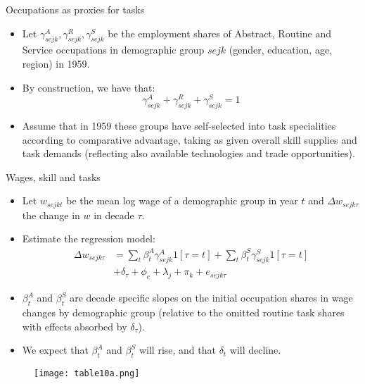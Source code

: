 \documentclass[notes=show]{beamer}
\begin{document}
\begin{frame}{Occupations as proxies for tasks}
\begin{itemize}
\item Let $ \gamma_{sejk}^{A}, \gamma_{sejk}^{R}, \gamma_{sejk}^{S}$ be the employment shares of Abstract, Routine and Service occupations in  demographic group $sejk$ (gender, education, age, region) in 1959. \medskip
\item By construction, we have that:
\[
\gamma_{sejk}^{A} + \gamma_{sejk}^{R} + \gamma_{sejk}^{S} = 1 
\]
\item Assume that in 1959 these groups have self-selected into task specialities according to comparative advantage, taking as given overall skill supplies and task demands (reflecting also available technologies and trade opportunities).
\end{itemize}
\end{frame}

\begin{frame}{Wages, skill and tasks}
\begin{itemize}
\item Let $w_{sejkt} $ be the mean log wage of a demographic group in year $t$ and $\Delta w_{sejk\tau}$ the change in $w$ in decade $\tau$. \smallskip
\item Estimate the regression model:
\begin{align*}
\Delta w_{sejk\tau} & = \sum_{t} \beta_{t}^{A} \gamma_{sejk}^{A} 1[\tau=t] + \sum_{t} \beta_{t}^{S} \gamma_{sejk}^{S} 1[\tau=t] \\ 
& + \delta_{\tau} + \phi_{e} + \lambda_{j} + \pi_{k} + e_{sejk\tau} \tag{40} \label{eq40} 
\end{align*}
\item $\beta_{t}^{A}$ and $\beta_{t}^{S}$ are decade specific slopes on the initial occupation shares in wage changes by demographic group (relative to the omitted   routine task shares with effects absorbed by $ \delta_{\tau}$). \smallskip
\item We expect that $\beta_{t}^{A}$ and $\beta_{t}^{S}$ will rise, and that $\delta_{t}$ will decline.
\end{itemize}
\end{frame}

\newpage
\begin{center}
\begin{figure}
\texttt{[image: table10a.png]}
\end{figure} 
\end{center}
\newpage
\end{document}
